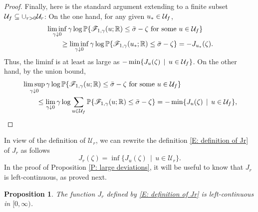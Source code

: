 \documentclass[10pt,a4paper]{amsart}
\newtheorem{prop}{Proposition}
\begin{document}
\begin{proof}
        Finally, here is the standard argument extending to a finite subset $\mathcal{U}_{ \rm f } \subseteq \cup_{r > 0} \mathcal{U}_{r}$: On the one hand, for any given $u_{*} \in \mathcal{U}_{ \rm f }$,
            \begin{align*}
                &\liminf_{\gamma \downarrow 0} \gamma \log \mathbb{P} \{ \mathscr{F}_{1,\gamma} ( u ; \mathbb{R} ) \leq \bar{\sigma} - \zeta \, \, \text{for some} \, \, u \in \mathcal{U}_{ \rm f } \} \\
                &\qquad\geq \liminf_{\gamma \downarrow 0} \gamma \log \mathbb{P} \{ \mathscr{F}_{1,\gamma} ( u_{*} ; \mathbb{R} ) \leq \bar{\sigma} - \zeta \} = -J_{u_{*}}(\zeta).
            \end{align*}  
        Thus, the liminf is at least as large as $-\min\{J_{u}(\zeta) \, \mid \, u \in \mathcal{U}_{ \rm f }\}$.   On the other hand, by the union bound,
            \begin{align*}
                &\limsup_{\gamma \downarrow 0} \gamma \log \mathbb{P} \{ \mathscr{F}_{1,\gamma} ( u ; \mathbb{R} ) \leq \bar{\sigma} - \zeta \, \, \text{for some} \, \, u \in \mathcal{U}_{ \rm f }  \}\\
                &\qquad \leq \lim_{\gamma \downarrow 0} \gamma \log \sum_{u \in \mathcal{U}_{ \rm f }} \mathbb{P} \{ \mathscr{F}_{1,\gamma}(u;\mathbb{R}) \leq \bar{\sigma} - \zeta \} = -\min\{J_{u}(\zeta) \, \mid \, u \in \mathcal{U}_{ \rm f }\} ,
            \end{align*}
            \end{proof} 
        
In view of the definition of $\mathcal{U}_{r}$, we can rewrite the definition \eqref{E: definition of Jr} of $J_{r}$ as follows
\begin{equation*}
    J_{r}(\zeta) = \inf \{ J_{u}(\zeta) \, \mid \, u \in \mathcal{U}_{r} \} .
\end{equation*}
In the proof of Proposition \ref{P: large deviations}, it will be useful to know that $J_{r}$ is left-continuous, as proved next.
 
	\begin{prop} \label{P: left-continuity}
		The function $J_{r}$ defined by \eqref{E: definition of Jr} is left-continuous in $[0,\infty)$.
	 \end{prop}
	
\end{document}
